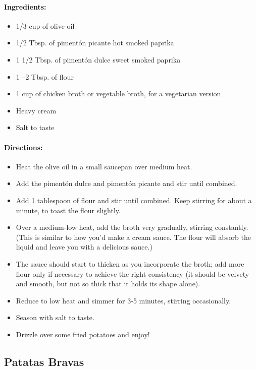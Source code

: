 \documentclass{article}
\begin{document}
\paragraph{Ingredients:}

\begin{itemize}
	\item 1/3 cup of olive oil
	\item 1/2 Tbsp. of pimentón picante hot smoked paprika
	\item 1 1/2 Tbsp. of pimentón dulce sweet smoked paprika
	\item 1 –2 Tbsp. of flour
	\item 1 cup of chicken broth or vegetable broth, for a vegetarian version
	\item Heavy cream
	\item Salt to taste
\end{itemize}

\paragraph{Directions:}
\begin{itemize}
	\item Heat the olive oil in a small saucepan over medium heat.
	\item Add the pimentón dulce and pimentón picante and stir until combined.
	\item Add 1 tablespoon of flour and stir until combined. Keep stirring for about a minute, to toast the flour slightly.
	\item Over a medium-low heat, add the broth very gradually, stirring constantly. (This is similar to how you'd make a cream sauce. The flour will absorb the liquid and leave you with a delicious sauce.)
	\item The sauce should start to thicken as you incorporate the broth; add more flour only if necessary to achieve the right consistency (it should be velvety and smooth, but not so thick that it holds its shape alone).
	\item Reduce to low heat and simmer for 3-5 minutes, stirring occasionally.
	\item Season with salt to taste.
	\item Drizzle over some fried potatoes and enjoy!
\end{itemize}

\subsection{Patatas Bravas}
\end{document}

